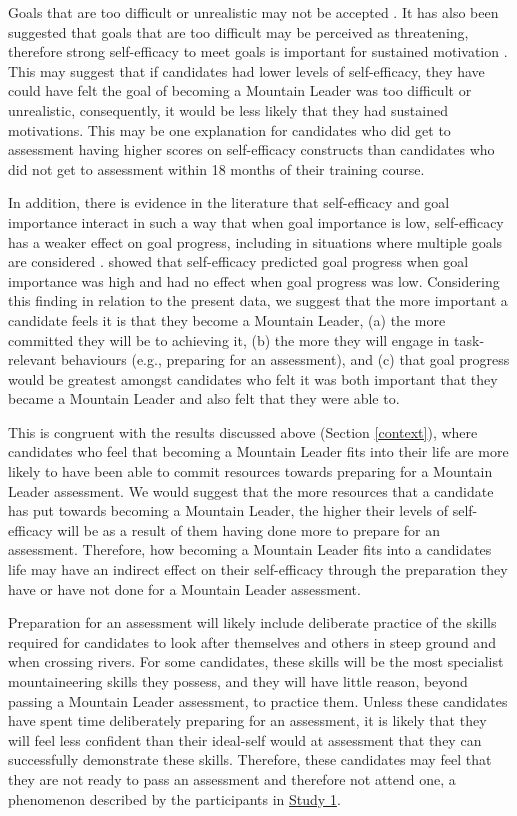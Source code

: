 \documentclass[
  12pt,
  a4paper,
]{book}
\begin{document}
Goals that are too difficult or unrealistic may not be accepted \citep{Kyllo1995}. It has also been suggested that goals that are too difficult may be perceived as threatening, therefore strong self-efficacy to meet goals is important for sustained motivation \citep{Bueno2008}. This may suggest that if candidates had lower levels of self-efficacy, they have could have felt the goal of becoming a Mountain Leader was too difficult or unrealistic, consequently, it would be less likely that they had sustained motivations. This may be one explanation for candidates who did get to assessment having higher scores on self-efficacy constructs than candidates who did not get to assessment within 18 months of their training course.

In addition, there is evidence in the literature that self-efficacy and goal importance interact in such a way that when goal importance is low, self-efficacy has a weaker effect on goal progress, including in situations where multiple goals are considered \citep[e.g.,][]{Beattie2015, Kernan1990, Orbell2001, Schmidt2007, Schmidt2009, Schmidt2009a}. \citet{Beattie2015} showed that self-efficacy predicted goal progress when goal importance was high and had no effect when goal progress was low. Considering this finding in relation to the present data, we suggest that the more important a candidate feels it is that they become a Mountain Leader, (a) the more committed they will be to achieving it, (b) the more they will engage in task-relevant behaviours (e.g., preparing for an assessment), and (c) that goal progress would be greatest amongst candidates who felt it was both important that they became a Mountain Leader and also felt that they were able to.

This is congruent with the results discussed above (Section \ref{context}), where candidates who feel that becoming a Mountain Leader fits into their life are more likely to have been able to commit resources towards preparing for a Mountain Leader assessment. We would suggest that the more resources that a candidate has put towards becoming a Mountain Leader, the higher their levels of self-efficacy will be as a result of them having done more to prepare for an assessment. Therefore, how becoming a Mountain Leader fits into a candidates life may have an indirect effect on their self-efficacy through the preparation they have or have not done for a Mountain Leader assessment.

Preparation for an assessment will likely include deliberate practice of the skills required for candidates to look after themselves and others in steep ground and when crossing rivers. For some candidates, these skills will be the most specialist mountaineering skills they possess, and they will have little reason, beyond passing a Mountain Leader assessment, to practice them. Unless these candidates have spent time deliberately preparing for an assessment, it is likely that they will feel less confident than their ideal-self would at assessment that they can successfully demonstrate these skills. Therefore, these candidates may feel that they are not ready to pass an assessment and therefore not attend one, a phenomenon described by the participants in \protect\hyperlink{ml-qualitative}{Study 1}.
\end{document}
